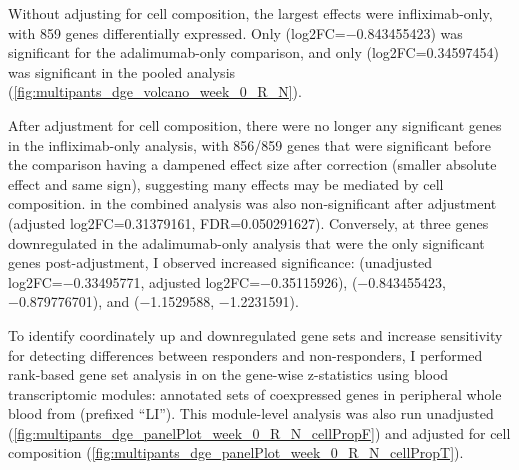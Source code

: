 Without adjusting for cell composition, the largest effects were infliximab-only, with 859 genes differentially expressed.
Only  (log2FC=\num{-0.843455423}) was significant for the adalimumab-only comparison, 
and only  (log2FC=\num{0.34597454}) was significant in the pooled analysis (\autoref{fig:multipants_dge_volcano_week_0_R_N}).

After adjustment for cell composition, there were no longer any significant genes in the infliximab-only analysis, 
with 856/859 genes that were significant before the comparison having a dampened effect size after correction (smaller absolute effect and same sign), suggesting many effects may be mediated by cell composition.
 in the combined analysis was also non-significant after adjustment (adjusted log2FC=\num{0.31379161}, FDR=\num{0.050291627}).
Conversely, at three genes downregulated in the adalimumab-only analysis that were the only significant genes post-adjustment, I observed increased significance:
 (unadjusted log2FC=\num{-0.33495771}, adjusted log2FC=\num{-0.35115926}), 
 (\num{-0.843455423}, \num{-0.879776701}), 
and  (\num{-1.1529588}, \num{-1.2231591}).

To identify coordinately up and downregulated gene sets and increase sensitivity for detecting differences between responders and non-responders,
I performed rank-based gene set analysis in on the gene-wise z-statistics using blood transcriptomic modules: annotated sets of coexpressed genes in peripheral whole blood from \textcite{li2013MolecularSignaturesAntibody} (prefixed \enquote{LI}).
This module-level analysis was also run unadjusted (\autoref{fig:multipants_dge_panelPlot_week_0_R_N_cellPropF}) and adjusted for cell composition (\autoref{fig:multipants_dge_panelPlot_week_0_R_N_cellPropT}).

